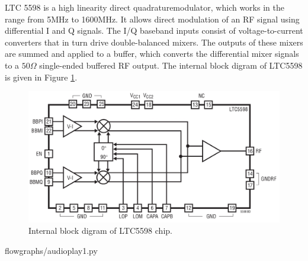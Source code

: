 \documentclass[a4paper,10pt]{article}
\begin{document}
LTC 5598\cite{bib:modchip}
is a high linearity direct quadraturemodulator, which works in the range from 5MHz to 1600MHz. 
It allows direct modulation of an RF signal using differential I and Q signals.
The I/Q baseband inputs consist of voltage-to-current converters that in turn drive double-balanced mixers.
The outputs of these mixers are summed and applied to a buffer,
which converts the differential mixer signals to a $50\Omega$ single-ended buffered RF output.
The internal block digram of LTC5598 is given in Figure \ref{fig:mod-block}.
\begin{figure}
\centering
\includegraphics[scale=0.4]{figures/ltc5598-block-diagram.jpg}
\caption{Internal block digram of LTC5598 chip. \label{fig:mod-block}}
\end{figure}




\newpage
\begin{appendices}

{flowgraphs/audioplay1.py}
\end{appendices}
\end{document}
